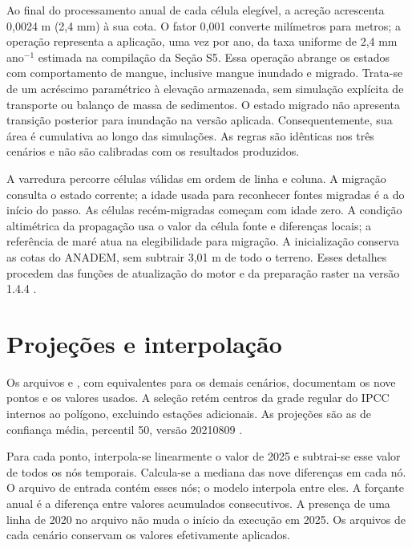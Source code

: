 \documentclass[12pt,a4paper]{article}
\begin{document}
Ao final do processamento anual de cada célula elegível, a acreção acrescenta 0,0024 m (2,4 mm) à sua cota. O fator 0,001 converte milímetros para metros; a operação representa a aplicação, uma vez por ano, da taxa uniforme de 2,4 mm ano$^{-1}$ estimada na compilação da Seção S5. Essa operação abrange os estados com comportamento de mangue, inclusive mangue inundado e migrado. Trata-se de um acréscimo paramétrico à elevação armazenada, sem simulação explícita de transporte ou balanço de massa de sedimentos. O estado migrado não apresenta transição posterior para inundação na versão aplicada. Consequentemente, sua área é cumulativa ao longo das simulações. As regras são idênticas nos três cenários e não são calibradas com os resultados produzidos.


A varredura percorre células válidas em ordem de linha e coluna. A migração consulta o estado corrente; a idade usada para reconhecer fontes migradas é a do início do passo. As células recém-migradas começam com idade zero. A condição altimétrica da propagação usa o valor da célula fonte e diferenças locais; a referência de maré atua na elegibilidade para migração. A inicialização conserva as cotas do ANADEM, sem subtrair 3,01 m de todo o terreno. Esses detalhes procedem das funções de atualização do motor e da preparação raster na versão 1.4.4 \citep{studio2026}.

\section{Projeções e interpolação}
Os arquivos  e , com equivalentes para os demais cenários, documentam os nove pontos e os valores usados. A seleção retém centros da grade regular do IPCC internos ao polígono, excluindo estações adicionais. As projeções são as de confiança média, percentil 50, versão 20210809 \citep{garner2021,fox2021,kopp2023}.

Para cada ponto, interpola-se linearmente o valor de 2025 e subtrai-se esse valor de todos os nós temporais. Calcula-se a mediana das nove diferenças em cada nó. O arquivo de entrada contém esses nós; o modelo interpola entre eles. A forçante anual é a diferença entre valores acumulados consecutivos. A presença de uma linha de 2020 no arquivo não muda o início da execução em 2025. Os arquivos  de cada cenário conservam os valores efetivamente aplicados.
\end{document}
